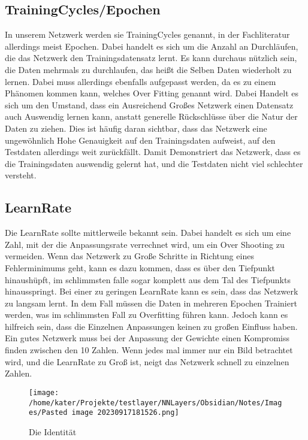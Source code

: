 \documentclass[12pt]{article}
\begin{document}
\subsection{ TrainingCycles/Epochen}In unserem Netzwerk werden sie TrainingCycles genannt, in der Fachliteratur allerdings meist Epochen. Dabei handelt es sich um die Anzahl an Durchläufen, die das Netzwerk den Trainingsdatensatz lernt. Es kann durchaus nützlich sein, die Daten mehrmals zu durchlaufen, das heißt die Selben Daten wiederholt zu lernen. Dabei muss allerdings ebenfalls aufgepasst werden, da es zu einem Phänomen kommen kann, welches Over Fitting genannt wird. Dabei Handelt es sich um den Umstand, dass ein Ausreichend Großes Netzwerk einen Datensatz auch Auswendig lernen kann, anstatt generelle Rückschlüsse über die Natur der Daten zu ziehen. Dies ist häufig daran sichtbar, dass das Netzwerk eine ungewöhnlich Hohe Genauigkeit auf den Trainingsdaten aufweist, auf den Testdaten allerdings weit zurückfällt. Damit Demonstriert das Netzwerk, dass es die Trainingsdaten auswendig gelernt hat, und die Testdaten nicht viel schlechter versteht. 
\subsection{ LearnRate}Die LearnRate sollte mittlerweile bekannt sein. Dabei handelt es sich um eine Zahl, mit der die Anpassungsrate verrechnet wird, um ein Over Shooting zu vermeiden. Wenn das Netzwerk zu Große Schritte in Richtung eines Fehlerminimums geht, kann es dazu kommen, dass es über den Tiefpunkt hinaushüpft, im schlimmsten falle sogar komplett aus dem Tal des Tiefpunkts hinausspringt. Bei einer zu geringen LearnRate kann es sein, dass das Netzwerk zu langsam lernt. In dem Fall müssen die Daten in mehreren Epochen Trainiert werden, was im schlimmsten Fall zu Overfitting führen kann. Jedoch kann es hilfreich sein, dass die Einzelnen Anpassungen keinen zu großen Einfluss haben. Ein gutes Netzwerk muss bei der Anpassung der Gewichte einen Kompromiss finden zwischen den 10 Zahlen. Wenn jedes mal immer nur ein Bild betrachtet wird, und die LearnRate zu Groß ist, neigt das Netzwerk schnell zu einzelnen Zahlen.\begin{figure}[H]
\centering
\texttt{[image: /home/kater/Projekte/testlayer/NNLayers/Obsidian/Notes/Images/Pasted image 20230917181526.png]}
\caption{Die Identität}
\label{Was kommt hier rein?}\end{figure}
\end{document}
